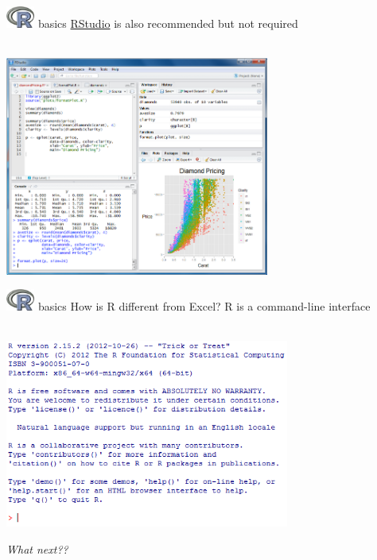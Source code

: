 \documentclass[xcolor=svgnames]{beamer}\usepackage[]{graphicx}\usepackage[]{color}
\begin{document}
\begin{frame}[t]{\includegraphics[width=0.07\textwidth]{Rlogo.jpg} \hspace{0.01in} basics}
\href{http://www.rstudio.com/}{RStudio} is also recommended but not required\\~\\
\centerline{\includegraphics[width=0.65\textwidth]{Rstudio.png}}
\end{frame}

\begin{frame}[t]{\includegraphics[width=0.07\textwidth]{Rlogo.jpg} \hspace{0.01in} basics}
How is R different from Excel? R is a command-line interface\\~\\
\centerline{\includegraphics[width=0.7\textwidth]{command_line.png}}
\centerline{\emph{What next??}}
\end{frame}
\end{document}
